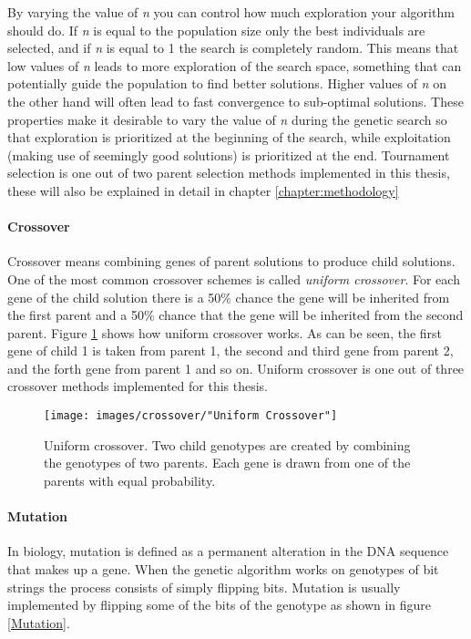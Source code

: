 \noindent By varying the value of \textit{n} you can control how much exploration your algorithm should do. If \textit{n} is equal to the population size only the best individuals are selected, and if \textit{n} is equal to 1 the search is completely random. This means that low values of \textit{n} leads to more exploration of the search space, something that can potentially guide the population to find better solutions. Higher values of \textit{n} on the other hand will often lead to fast convergence to sub-optimal solutions. These properties make it desirable to vary the value of \textit{n} during the genetic search so that exploration is prioritized at the beginning of the search, while exploitation (making use of seemingly good solutions) is prioritized at the end. Tournament selection is one out of two parent selection methods implemented in this thesis, these will also be explained in detail in chapter \ref{chapter:methodology}\\


\paragraph*{Crossover}
Crossover means combining genes of parent solutions to produce child solutions. One of the most common crossover schemes is called \textit{uniform crossover}. For each gene of the child solution there is a 50\% chance the gene will be inherited from the first parent and a 50\% chance that the gene will be inherited from the second parent. Figure \ref{Uniform Crossover} shows how uniform crossover works. As can be seen, the first gene of child 1 is taken from parent 1, the second and third gene from parent 2, and the forth gene from parent 1 and so on. Uniform crossover is one out of three crossover methods implemented for this thesis.


\begin{figure}[h!]
\begin{center}
\texttt{[image: images/crossover/"Uniform Crossover"]}
\caption{Uniform crossover. Two child genotypes are created by combining the genotypes of two parents. Each gene is drawn from one of the parents with equal probability.}
\label{Uniform Crossover}
\end{center}
\end{figure}


\paragraph*{Mutation}
In biology, mutation is defined as a permanent alteration in the DNA sequence that makes up a gene. When the genetic algorithm works on genotypes of bit strings the process consists of simply flipping bits. Mutation is usually implemented by flipping some of the bits of the genotype as shown in figure \ref{Mutation}. \\



